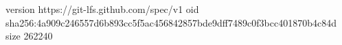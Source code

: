 version https://git-lfs.github.com/spec/v1
oid sha256:4a909c246557d6b893cc5f5ac456842857bde9dff7489c0f3bcc401870b4c84d
size 262240
